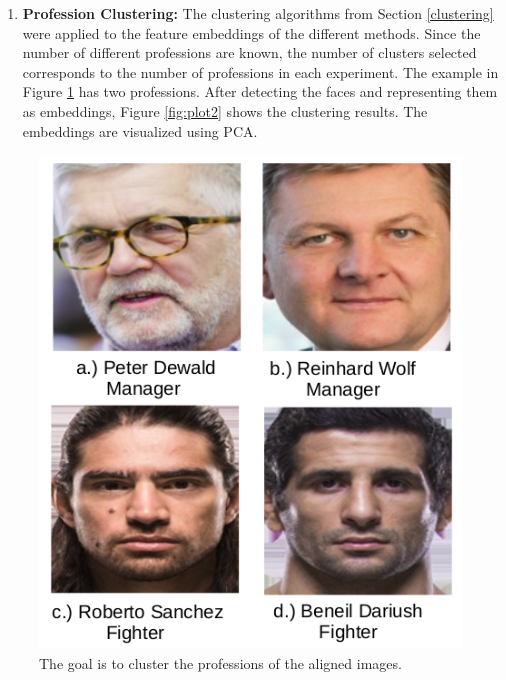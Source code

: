 \documentclass[12pt,english]{article}
\begin{document}
\begin{enumerate}
\item \textbf{Profession Clustering: } The clustering algorithms from Section \ref{clustering} were applied to the feature embeddings of the different methods. Since the number of different professions are known, the number of clusters selected corresponds to the number of professions in each experiment. The example in Figure \ref{fig:plot1} has two professions. After detecting the faces and representing them as embeddings, Figure \ref{fig:plot2} shows the clustering results. The embeddings are visualized using PCA.
\end{enumerate}

\begin{figure}[H]
  \centering
  \begin{minipage}[b]{0.3\textwidth}
    \includegraphics[width=\textwidth]{figures/plot2.png}
    \caption{The goal is to cluster the professions of the aligned images.}
    \label{fig:plot1}
  \end{minipage}
  \hfill
  \begin{minipage}[b]{0.6\textwidth}

\end{minipage}
\end{figure}
\end{document}
